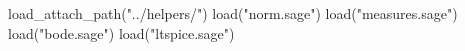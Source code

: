 \begin{sagesilent}
    load_attach_path("../helpers/")
    load("norm.sage")
    load("measures.sage")
    load("bode.sage")
    load("ltspice.sage")
\end{sagesilent}